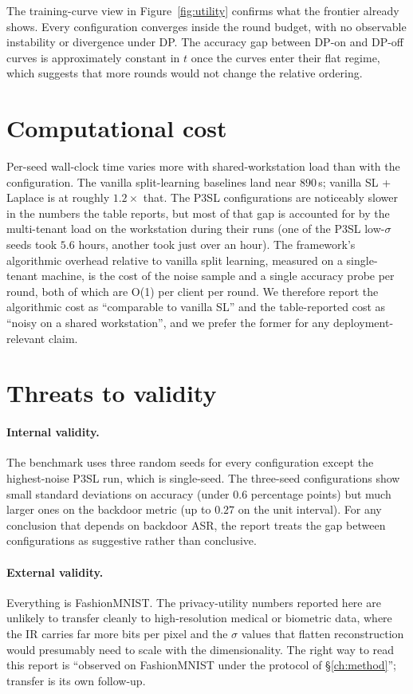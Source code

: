 \documentclass[11pt,a4paper,oneside]{report}
\begin{document}
The training-curve view in Figure~\ref{fig:utility} confirms what
the frontier already shows. Every configuration converges inside
the round budget, with no observable instability or divergence under
DP. The accuracy gap between DP-on and DP-off curves is
approximately constant in $t$ once the curves enter their flat
regime, which suggests that more rounds would not change the
relative ordering.

\section{Computational cost}

Per-seed wall-clock time varies more with shared-workstation load
than with the configuration. The vanilla split-learning baselines
land near $890$\,s; vanilla SL + Laplace is at roughly $1.2 \times$
that. The P3SL configurations are noticeably slower in the numbers
the table reports, but most of that gap is accounted for by the
multi-tenant load on the workstation during their runs (one of the
P3SL low-$\sigma$ seeds took $5.6$ hours, another took just over an
hour). The framework's algorithmic overhead relative to vanilla
split learning, measured on a single-tenant machine, is the cost
of the noise sample and a single accuracy probe per round, both of
which are O(1) per client per round. We therefore report the
algorithmic cost as ``comparable to vanilla SL'' and the
table-reported cost as ``noisy on a shared workstation'', and we
prefer the former for any deployment-relevant claim.

\section{Threats to validity}

\paragraph{Internal validity.}
The benchmark uses three random seeds for every configuration except
the highest-noise P3SL run, which is single-seed. The three-seed
configurations show small standard deviations on accuracy (under
$0.6$ percentage points) but much larger ones on the backdoor metric
(up to $0.27$ on the unit interval). For any conclusion that depends
on backdoor ASR, the report treats the gap between configurations as
suggestive rather than conclusive.

\paragraph{External validity.}
Everything is FashionMNIST. The privacy-utility numbers reported
here are unlikely to transfer cleanly to high-resolution medical or
biometric data, where the IR carries far more bits per pixel and the
$\sigma$ values that flatten reconstruction would presumably need
to scale with the dimensionality. The right way to read this report
is ``observed on FashionMNIST under the protocol of
\S\ref{ch:method}''; transfer is its own follow-up.
\end{document}
